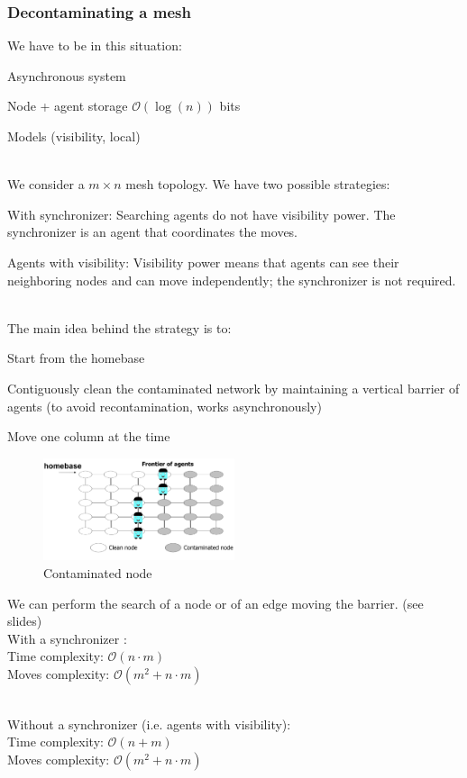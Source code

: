 \documentclass[paper=a4, fontsize=11pt]{scrartcl} %
\numberwithin{equation}{section} %
\numberwithin{figure}{section} %
\numberwithin{table}{section} %
\begin{document}
\subsubsection*{Decontaminating a mesh}
We have to be in this situation: 
\begin{compactitem}
\item Asynchronous system
\item Node + agent storage $\mathcal{O}(\log(n))$ bits
\item Models (visibility, local)
\end{compactitem}
~ \\ 
We consider a $m \times n$ mesh topology. We have two possible strategies:
\begin{compactenum}
\item With synchronizer: Searching agents do not have visibility power. The synchronizer is an agent that coordinates the moves.
\item Agents with visibility: Visibility power means that agents can see their neighboring nodes and can move independently; the synchronizer is not required.
\end{compactenum}
~ \\ 
The main idea behind the strategy is to: 
\begin{compactenum}
\item Start from the homebase
\item Contiguously clean the contaminated network by maintaining a vertical barrier of agents (to avoid recontamination, works asynchronously)
\item Move one column at the time
\end{compactenum}
\begin{figure}[H]
  \centering
  \includegraphics[width=0.5\textwidth]{img/cont_front.png}
  \caption{Contaminated node}
  
\end{figure}
We can perform the search of a node or of an edge moving the barrier. (see slides)
\\
With a synchronizer	: \\
Time complexity: $\mathcal{O}(n\cdot m)$ \\
Moves complexity: $\mathcal{O}(m^2 + n\cdot m)$

~ \\
Without a synchronizer (i.e. agents with visibility): \\
Time complexity: $\mathcal{O}(n + m)$ \\ 
Moves complexity: $\mathcal{O}(m^2 + n\cdot m)$
\end{document}
